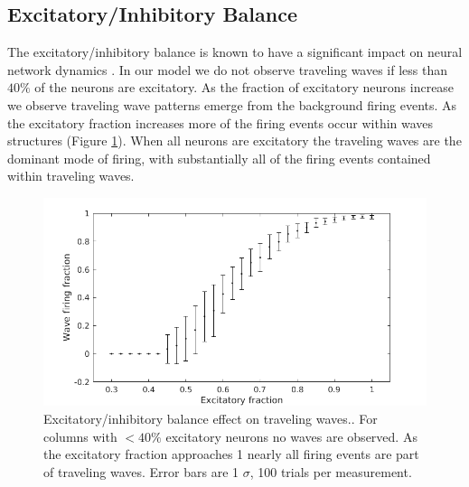 \documentclass[a4paper,11pt]{article}
\begin{document}
\subsection{Excitatory/Inhibitory Balance} \label{sub:ei_balance}
The excitatory/inhibitory balance is known to have a significant impact on neural network dynamics \cite{keane2015}. 
In our model we do not observe traveling waves if less than $40\%$ of the neurons are excitatory.
As the fraction of excitatory neurons increase we observe traveling wave patterns emerge from the background firing events.
As the excitatory fraction increases more of the firing events occur within waves structures (Figure \ref{fig:excitatory_effect}).
When all neurons are excitatory the traveling waves are the dominant mode of firing, with substantially all of the firing events contained within traveling waves. \\
\begin{figure}[!htb]
 \caption{Excitatory/inhibitory balance effect on traveling waves.. 
	  For columns with $<40\%$ excitatory neurons no waves are observed.
	  As the excitatory fraction approaches 1 nearly all firing events are part of traveling waves.
	  Error bars are 1 $\sigma$, 100 trials per measurement.
	  }
 \label{fig:excitatory_effect}
 \centering
   \includegraphics[width=\textwidth]{fig/ExcitatoryWaves}
\end{figure}
\end{document}
